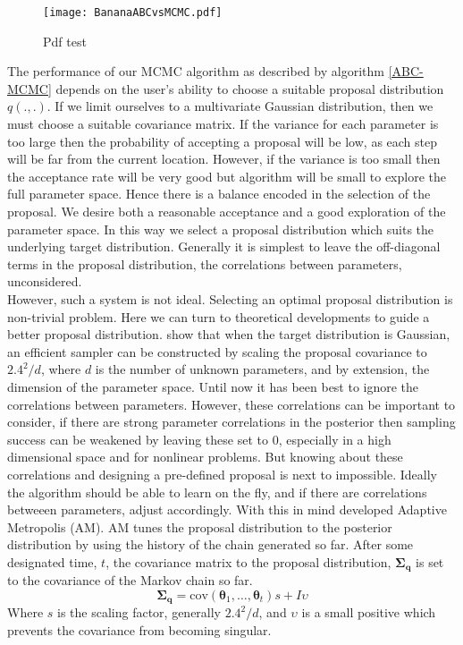\begin{figure}[H]
\centering
\texttt{[image: BananaABCvsMCMC.pdf]}
\caption{Pdf test}
\end{figure}

The performance of our MCMC algorithm as described by algorithm \ref{ABC-MCMC} depends on the user's ability to choose a suitable proposal distribution $q(.,.)$. If we limit ourselves to a multivariate Gaussian distribution, then we must choose a suitable covariance matrix. If the variance for each parameter is too large then the probability of accepting a proposal will be low, as each step will be far from the current location. However, if the variance is too small then the acceptance rate will be very good but algorithm will be small to explore the full parameter space. Hence there is a balance encoded in the selection of the proposal. We desire both a reasonable acceptance and a good exploration of the parameter space. In this way we select a proposal distribution which suits the underlying target distribution. Generally it is simplest to leave the off-diagonal terms in the proposal distribution, the correlations between parameters, unconsidered.\\

However, such a system is not ideal. Selecting an optimal proposal distribution is non-trivial problem. Here we can turn to theoretical developments to guide a better proposal distribution. \citet{gelman1996} show that when the target distribution is Gaussian, an efficient sampler can be constructed by scaling the proposal covariance to $2.4^2/d$, where $d$ is the number of unknown parameters, and by extension, the dimension of the parameter space. Until now it has been best to ignore the correlations between parameters. However, these correlations can be important to consider, if there are strong parameter correlations in the posterior then sampling success can be weakened by leaving these set to 0, especially in a high dimensional space and for nonlinear problems. But knowing about these correlations and designing a pre-defined proposal is next to impossible. Ideally the algorithm should be able to learn on the fly, and if there are correlations betweeen parameters, adjust accordingly. With this in mind \citet{haario2001} developed Adaptive Metropolis (AM). AM tunes the proposal distribution to the posterior distribution by using the history of the chain generated so far. After some designated time, $t$, the covariance matrix to the proposal distribution, $\bm{\Sigma_q}$ is set to the covariance of the Markov chain so far. 
\begin{equation}
\bm{\Sigma_q} = \text{cov}(\bm{\theta}_1,\dots,\bm{\theta}_t)s + I\upsilon
\end{equation}
Where $s$ is the scaling factor, generally $2.4^2/d$, and $\upsilon$ is a small positive which prevents the covariance from becoming singular. 


